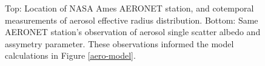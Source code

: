 \documentclass[12pt]{article}
\begin{document}
\begin{figure}[h!]
\begin{center}
        \end{center}
        \caption{Top: Location of NASA Ames AERONET station, and cotemporal measurements of aerosol effective radius distribution. Bottom: Same AERONET station's observation of aerosol single scatter albedo and assymetry parameter. These observations informed the model calculations in Figure \ref{aero-model}.}
        \label{aeronet}
    \end{figure}
\end{document}

